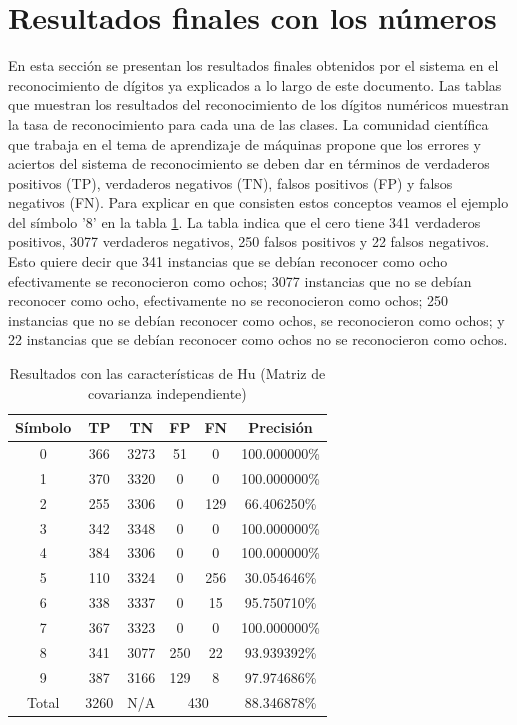 \documentclass[a4paper, 11pt, oneside]{report}
\begin{document}
\section{Resultados finales con los números}
En esta sección se presentan los resultados finales obtenidos por el sistema en el reconocimiento de dígitos ya explicados a lo largo de este documento. Las tablas que muestran los resultados del reconocimiento de los dígitos numéricos muestran la tasa de reconocimiento para cada una de las clases. La comunidad científica que trabaja en el tema de aprendizaje de máquinas propone que los errores y aciertos del sistema de reconocimiento se deben dar en términos de verdaderos positivos (TP), verdaderos negativos (TN), falsos positivos (FP) y falsos negativos (FN). Para explicar en que consisten estos conceptos veamos el ejemplo del símbolo '8' en la tabla \ref{tb:numHuIndep}. La tabla indica que el cero tiene 341 verdaderos positivos, 3077 verdaderos negativos, 250 falsos positivos y 22 falsos negativos. Esto quiere decir que 341 instancias que se debían reconocer como ocho efectivamente se reconocieron como ochos; 3077 instancias que no se debían reconocer como ocho, efectivamente no se reconocieron como ochos; 250 instancias que no se debían reconocer como ochos, se reconocieron como ochos; y 22 instancias que se debían reconocer como ochos no se reconocieron como ochos.

\begin{table}
\centering
\begin{tabular}{|c|c|c|c|c|c|}
	\hline
	Símbolo & TP & TN & FP & FN & Precisión \\ 
	\hline
	0 & 366 & 3273 & 51 & 0 & 100.000000\% \\ 
	1 & 370 & 3320 & 0 & 0 & 100.000000\% \\ 
	2 & 255 & 3306 & 0 & 129 & 66.406250\% \\ 
	3 & 342 & 3348 & 0 & 0 & 100.000000\% \\ 
	4 & 384 & 3306 & 0 & 0 & 100.000000\% \\ 
	5 & 110 & 3324 & 0 & 256 & 30.054646\% \\ 
	6 & 338 & 3337 & 0 & 15 & 95.750710\% \\ 
	7 & 367 & 3323 & 0 & 0 & 100.000000\% \\ 
	8 & 341 & 3077 & 250 & 22 & 93.939392\% \\ 
	9 & 387 & 3166 & 129 & 8 & 97.974686\% \\ 
	\hline
	Total & 3260 & N/A & \multicolumn{2}{|c|}{430} & 88.346878\% \\
	\hline
\end{tabular}
\caption{Resultados con las características de Hu (Matriz de covarianza independiente)}
\label{tb:numHuIndep}
\end{table}
\end{document}
